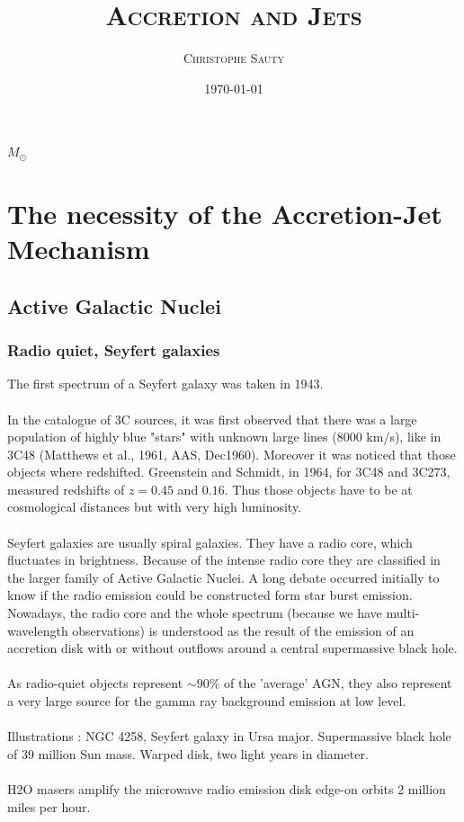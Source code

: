\documentclass[10pt,a4paper,english]{article}
\title{\textsc{Accretion and Jets}}
\author{\textsc{Christophe Sauty}}
\date{\today}
\begin{document}
 
\maketitle

\begin{center}
    $M_{\odot}$ %
\end{center}

\tableofcontents

\newpage
{} %

\section{The necessity of the Accretion-Jet Mechanism}
\subsection{Active Galactic Nuclei}
\subsubsection{Radio quiet, Seyfert galaxies}
The first spectrum of a Seyfert galaxy was taken in 1943.\\
\\
In the catalogue of 3C sources, it was first observed that there was a large population of highly blue "stars" with unknown large lines (8000 km/s), like in 3C48 (Matthews et al., 1961, AAS, Dec1960). Moreover it was noticed that those objects where redshifted. Greenstein and Schmidt, in 1964, for 3C48 and 3C273, measured redshifts of $z=0.45$ and $0.16$. Thus those objects have to be at cosmological distances but with very high luminosity.\\
\\
Seyfert galaxies are usually spiral galaxies. They have a radio core, which fluctuates in brightness. Because of the intense radio core they are classified in the larger family of Active Galactic Nuclei. A long debate occurred initially to know if the radio emission could be constructed form star burst emission. Nowadays, the radio core and the whole spectrum (because we have multi-wavelength observations) is understood as the result of the emission of an accretion disk with or without outflows around a central supermassive black hole.\\
\\
As radio-quiet objects represent $\sim 90 \% $ of the 'average' AGN, they also represent a very large source for the gamma ray background emission at low level.\\
\\
Illustrations : NGC 4258, Seyfert galaxy in Ursa major. Supermassive black hole of 39 million Sun mass. Warped disk, two light years in diameter.\\
\\
H2O masers amplify the microwave radio emission disk edge-on orbits 2 million miles per hour.
\end{document}
